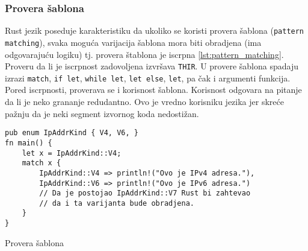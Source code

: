 \subsubsection{Provera šablona}
Rust jezik poseduje karakteristiku da ukoliko se koristi provera šablona (\verb|pattern matching|), svaka moguća 
varijacija šablona mora biti obradjena (ima odgovarajuću logiku) tj. provera štablona je iscrpna \ref{lst:pattern_matching}.
Proveru da li je iscrpnost zadovoljena izvršava \verb|THIR|. U provere šablona spadaju izrazi \verb|match|, \verb|if let|, \verb|while let|,
\verb|let else|, \verb|let|, pa čak i argumenti funkcija. Pored iscrpnosti, proverava se i korisnost šablona. Korisnost odgovara na pitanje 
da li je neko grananje redudantno. Ovo je vredno korisniku jezika jer skreće pažnju da je neki segment izvornog koda nedostižan. 



\begin{listing}[H]
\begin{verbatim}
pub enum IpAddrKind { V4, V6, }
fn main() {
    let x = IpAddrKind::V4;
    match x {
        IpAddrKind::V4 => println!("Ovo je IPv4 adresa."), 
        IpAddrKind::V6 => println!("Ovo je IPv6 adresa.") 
        // Da je postojao IpAddrKind::V7 Rust bi zahtevao 
        // da i ta varijanta bude obradjena.
    }
}
\end{verbatim}
\caption{Provera šablona}
\label{lst:pattern_matching}
\end{listing}